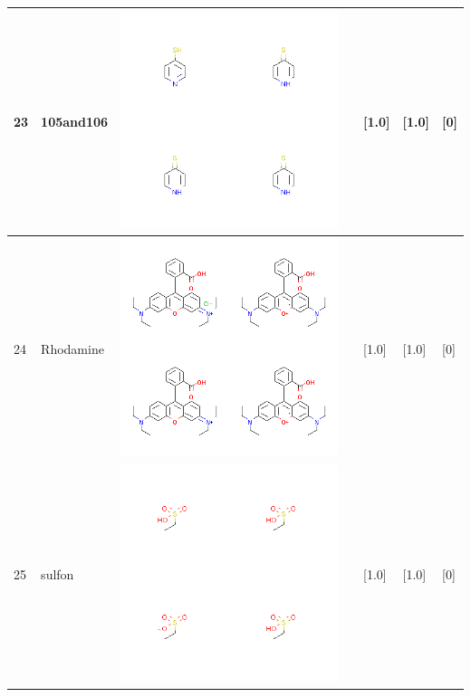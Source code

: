 \begin{longtable}{|l|l|l|l|l|l|l|}
\hline
23 & 105and106 & \includegraphics[scale=0.6]{105and106MV.png} & & [1.0]& [1.0] & [0] \\
\hline
24 & Rhodamine & \includegraphics[scale=0.6]{RhodamineMV.png} & & [1.0]& [1.0] & [0] \\
\hline
25 & sulfon & \includegraphics[scale=0.6]{sulfonMV.png} & & [1.0]& [1.0] & [0] \\

\end{longtable}

